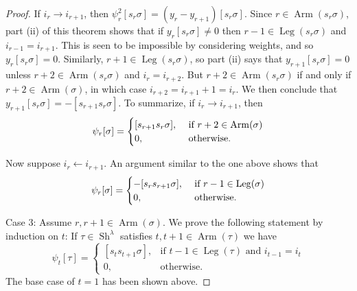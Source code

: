 \documentclass[twoside,11pt,reqno,letter]{amsart}
\numberwithin{equation}{section}
\theoremstyle{definition}  %
\newcommand{\Arm}{\operatorname{Arm}}
\newcommand{\Leg}{\operatorname{Leg}}
\newcommand{\Sh}{\operatorname{Sh}}
\newcommand{\0}{{\bar 0}}
\newcommand{\1}{{\bar 1}}
\newcommand{\la}{\lambda}
\newcommand{\si}{\sigma}
\begin{document}
{\begin{proof}
    If $i_r \to i_{r+1}$, then $\psi_r^2 [s_r \si] = (y_r - y_{r+1})[s_r \si]$.
    Since $r \in \Arm(s_r \si)$, part (ii) of this theorem shows that if $y_r [s_r \si] \neq 0$ then $r-1 \in \Leg(s_r \si)$ and $i_{r-1} = i_{r+1}$. %
    This is seen to be impossible by considering weights, %
    and so $y_r [s_r \si] = 0$.
    Similarly, $r+1 \in \Leg(s_r \si)$, so part (ii) says that $y_{r+1}[s_r \si] = 0$ unless $r+2 \in \Arm(s_r \si)$ and $i_r = i_{r+2}$. %
    But $r+2 \in \Arm(s_r \si)$ if and only if $r+2 \in \Arm(\si)$, in which case $i_{r+2} = i_{r+1} + 1 = i_r$. We then conclude that $y_{r+1}[s_r \si] = -[s_{r+1} s_r \si]$. To summarize, if $i_r \to i_{r+1}$, then
      \[ \psi_r [\si] = \begin{cases}
             [s_{r+1} s_r \si],& \textup{ if $r+2 \in \Arm(\si)$}\\
         0,& \textup{ otherwise.}
      \end{cases} \]

    Now suppose $i_r \leftarrow i_{r+1}$. An argument similar to the one above shows that
      \[ \psi_r [\si] = \begin{cases}
             -[s_r s_{r+1} \si],& \textup{ if $r-1 \in \Leg(\si)$}\\
         0,& \textup{ otherwise.}
      \end{cases} \]
    

    Case 3: Assume $r, r+1 \in \Arm(\si)$. We prove the following statement by induction on $t$: If $\tau \in \Sh^\la$ satisfies $t, t+1 \in \Arm(\tau)$ we have 
    $$\psi_t [\tau] = \begin{cases} [s_t s_{t+1} \si], & \text{if $t-1 \in \Leg(\tau)$ and $i_{t-1} = i_t$}\\
      0, & \text{otherwise.}
    \end{cases}$$
    The base case of $t=1$ has been shown above.


\end{proof}}
\end{document}
